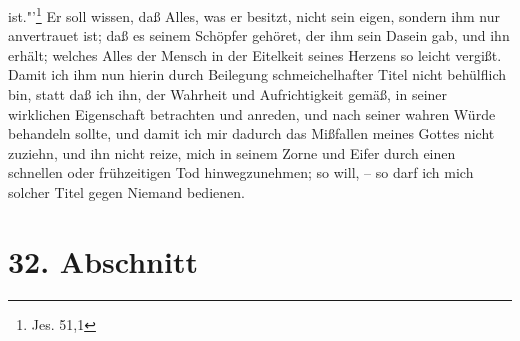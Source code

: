 ist."'\footnote{Jes. 51,1} Er soll wissen, daß Alles, was er besitzt, nicht sein
eigen, sondern ihm nur anvertrauet ist; daß es seinem Schöpfer gehöret, der ihm
sein Dasein gab, und ihn erhält; welches Alles der Mensch in der Eitelkeit
seines Herzens so leicht vergißt. Damit ich ihm nun hierin durch Beilegung
schmeichelhafter Titel nicht behülflich bin, statt daß ich ihn, der Wahrheit und
Aufrichtigkeit gemäß, in seiner wirklichen Eigenschaft betrachten und anreden,
und nach seiner wahren Würde behandeln sollte, und damit ich mir dadurch das
Mißfallen meines Gottes nicht zuziehn, und ihn nicht reize, mich in seinem Zorne
und Eifer durch einen schnellen oder frühzeitigen Tod hinwegzunehmen; so will,
-- so darf ich mich solcher Titel gegen Niemand bedienen.

\section{32. Abschnitt} \label{kap9_ab32}

